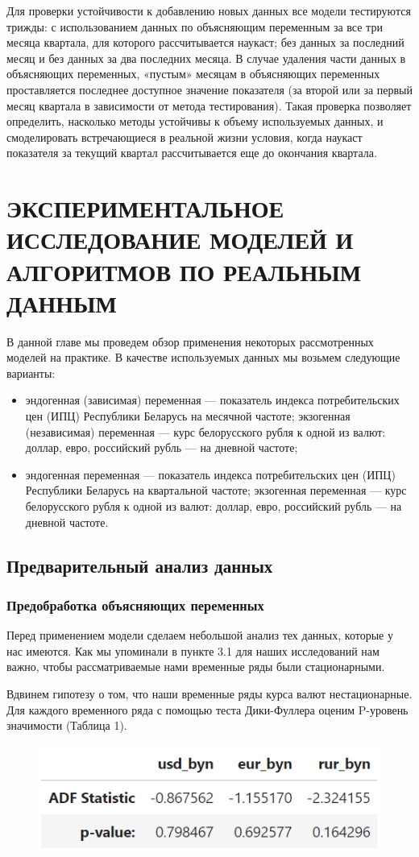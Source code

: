\documentclass[a4paper, 12pt]{extarticle}
\begin{document}
	Для проверки устойчивости к добавлению новых данных все модели тестируются трижды: с использованием данных по объясняющим переменным за все три месяца квартала, для которого рассчитывается наукаст; без данных за последний месяц и без данных за два последних месяца. В случае удаления части данных в объясняющих переменных, «пустым» месяцам в объясняющих переменных проставляется последнее доступное значение показателя (за второй или за первый месяц квартала в зависимости от метода тестирования). Такая проверка позволяет определить, насколько методы устойчивы к объему используемых данных, и смоделировать встречающиеся в реальной жизни условия, когда наукаст показателя за текущий квартал рассчитывается еще до окончания квартала. 
	\newpage
	\section{ЭКСПЕРИМЕНТАЛЬНОЕ ИССЛЕДОВАНИЕ МОДЕЛЕЙ И АЛГОРИТМОВ ПО РЕАЛЬНЫМ ДАННЫМ}
	В данной главе мы проведем обзор применения некоторых рассмотренных моделей на практике. В качестве используемых данных мы возьмем следующие варианты:
	\begin{itemize}
		\item эндогенная (зависимая) переменная --- показатель индекса потребительских цен (ИПЦ) Республики Беларусь на месячной частоте; экзогенная (независимая) переменная --- курс белорусского рубля к одной из валют: доллар, евро, российский рубль --- на дневной частоте;
		\item эндогенная переменная --- показатель индекса потребительских цен (ИПЦ) Республики Беларусь на квартальной частоте; экзогенная переменная --- курс белорусского рубля к одной из валют: доллар, евро, российский рубль --- на дневной частоте.
	\end{itemize}
	\subsection{Предварительный анализ данных}
	\subsubsection{Предобработка объясняющих переменных}
	Перед применением модели сделаем небольшой анализ тех данных, которые у нас имеются. Как мы упоминали в пункте 3.1 для наших исследований нам важно, чтобы рассматриваемые нами временные ряды были стационарными.
	
	Вдвинем гипотезу о том, что наши временные ряды курса валют нестационарные. Для каждого временного ряда с помощью теста Дики-Фуллера оценим P-уровень значимости (Таблица 1).
	\begin{figure}[h!]
		\centering
		\includegraphics[scale=1.3]{images/tab_1}
		\label{fig:tab1}
	\end{figure}
	
\end{document}
